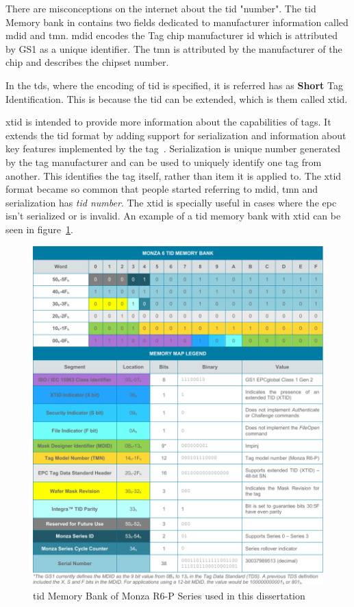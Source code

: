 There are misconceptions on the internet about the \ac{tid} "number".
The \ac{tid} Memory bank in contains two fields dedicated to manufacturer information called \ac{mdid} and \ac{tmn}.
\ac{mdid} encodes the Tag chip manufacturer \ac{id} which is attributed by GS1 as a unique identifier.
The \ac{tmn} is attributed by the manufacturer of the chip and describes the chipset number.

In the \ac{tds}, where the encoding of \ac{tid} is specified, it is referred has as \textbf{Short} Tag Identification.
This is because the \ac{tid} can be extended, which is them called \ac{xtid}.

\ac{xtid} is intended to provide more information about the capabilities of tags. It extends the \ac{tid} format by adding support for serialization and information about key features implemented by the tag~\cite{GS1EPCTDS}.
Serialization is unique number generated by the tag manufacturer and can be used to uniquely identify one tag from another.
This identifies the tag itself, rather than item it is applied to.
The \ac{xtid} format became so common that people started referring to \ac{mdid}, \ac{tmn} and serialization has \emph{\ac{tid} number}.
The \ac{xtid} is specially useful in cases where the \ac{epc} isn’t serialized or is invalid.
An example of a \ac{tid} memory bank with \ac{xtid} can be seen in figure~\ref{fig:tid}.

\begin{figure}
    \centering
    \includegraphics[width=\textwidth]{./figs/02-state-of-the-art/tid.pdf}
    \caption{\ac{tid} Memory Bank of Monza R6-P Series used in this dissertation~\cite{TIDMemoryMaps}} 
    \label{fig:tid}
\end{figure}

